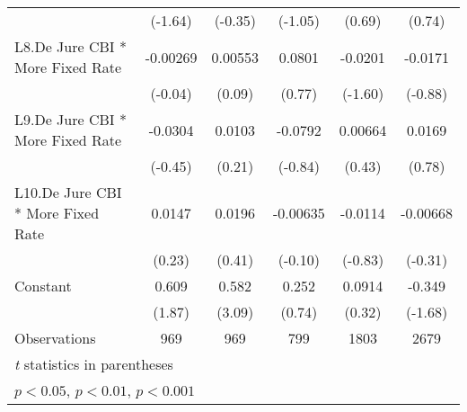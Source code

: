 {\begin{tabular*}{\linewidth}{@{\hskip\tabcolsep\extracolsep\fill}l*{5}{c}}
                &  (-1.64)         &  (-0.35)         &  (-1.05)         &   (0.69)         &   (0.74)         \\
[1em]
L8.De Jure CBI * More Fixed Rate& -0.00269         &  0.00553         &   0.0801         &  -0.0201         &  -0.0171         \\
                &  (-0.04)         &   (0.09)         &   (0.77)         &  (-1.60)         &  (-0.88)         \\
[1em]
L9.De Jure CBI * More Fixed Rate&  -0.0304         &   0.0103         &  -0.0792         &  0.00664         &   0.0169         \\
                &  (-0.45)         &   (0.21)         &  (-0.84)         &   (0.43)         &   (0.78)         \\
[1em]
L10.De Jure CBI * More Fixed Rate&   0.0147         &   0.0196         & -0.00635         &  -0.0114         & -0.00668         \\
                &   (0.23)         &   (0.41)         &  (-0.10)         &  (-0.83)         &  (-0.31)         \\
[1em]
Constant        &    0.609         &    0.582\sym{**} &    0.252         &   0.0914         &   -0.349         \\
                &   (1.87)         &   (3.09)         &   (0.74)         &   (0.32)         &  (-1.68)         \\
\hline
Observations    &      969         &      969         &      799         &     1803         &     2679         \\
\hline\hline
\multicolumn{6}{l}{\footnotesize \textit{t} statistics in parentheses}\\
\multicolumn{6}{l}{\footnotesize \sym{*} \(p<0.05\), \sym{**} \(p<0.01\), \sym{***} \(p<0.001\)}\\
\end{tabular*}
}
